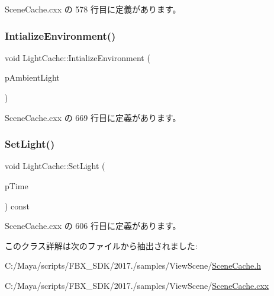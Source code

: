  Scene\+Cache.\+cxx の 578 行目に定義があります。

\mbox{\label{class_light_cache_a4001efcf88a816364fea9cfce1c16cac}} 
\subsubsection{\texorpdfstring{Intialize\+Environment()}{IntializeEnvironment()}}
{\footnotesize\ttfamily void Light\+Cache\+::\+Intialize\+Environment (\begin{DoxyParamCaption}\item[{const \hyperlink{class_fbx_color}{Fbx\+Color} \&}]{p\+Ambient\+Light }\end{DoxyParamCaption})\hspace{0.3cm}{\ttfamily [static]}}



 Scene\+Cache.\+cxx の 669 行目に定義があります。

\mbox{\label{class_light_cache_a2942547e3b3262e1da08380b4c7323df}} 
\subsubsection{\texorpdfstring{Set\+Light()}{SetLight()}}
{\footnotesize\ttfamily void Light\+Cache\+::\+Set\+Light (\begin{DoxyParamCaption}\item[{const \hyperlink{class_fbx_time}{Fbx\+Time} \&}]{p\+Time }\end{DoxyParamCaption}) const}



 Scene\+Cache.\+cxx の 606 行目に定義があります。



このクラス詳解は次のファイルから抽出されました\+:\begin{DoxyCompactItemize}
\item 
C\+:/\+Maya/scripts/\+F\+B\+X\+\_\+\+S\+D\+K/2017./samples/\+View\+Scene/\hyperlink{_scene_cache_8h}{Scene\+Cache.\+h}\item 
C\+:/\+Maya/scripts/\+F\+B\+X\+\_\+\+S\+D\+K/2017./samples/\+View\+Scene/\hyperlink{_scene_cache_8cxx}{Scene\+Cache.\+cxx}\end{DoxyCompactItemize}

